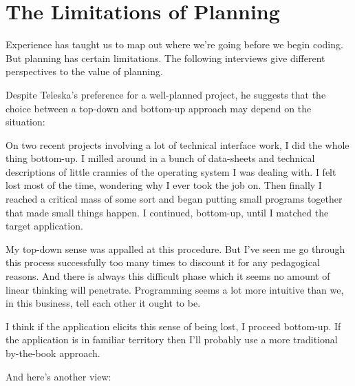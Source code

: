 \section{The Limitations of Planning}

Experience has taught us to map out where we're going before we begin
coding. But planning has certain limitations. The following interviews
give different perspectives to the value of planning.

\begin{interview}
\noindent Despite Teleska's preference for a well-planned project, he suggests that
the choice between a top-down and bottom-up approach may depend on
the situation:

\begin{tfquot}
On two recent projects involving a lot of technical interface work, I did the
whole thing bottom-up. I milled around in a bunch of data-sheets and
technical descriptions of little crannies of the operating system I was
dealing with. I felt lost most of the time, wondering why I ever took the job on.
Then finally I reached a critical mass of some sort and began putting small
programs together that made small things happen. I continued, bottom-up,
until I matched the target application.

My top-down sense was appalled at this procedure. But I've seen me go
through this process successfully too many times to discount it for any
pedagogical reasons. And there is always this difficult phase which it seems
no amount of linear thinking will penetrate. Programming seems a lot more
intuitive than we, in this business, tell each other it ought to be.

I think if the application elicits this sense of being lost, I proceed
bottom-up. If the application is in familiar territory then I'll probably
use a more traditional by-the-book approach.
\end{tfquot}
\end{interview}


\noindent And here's another view:

